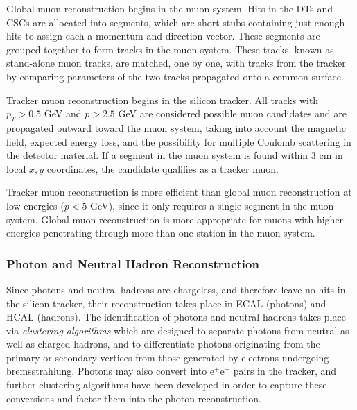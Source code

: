 Global muon reconstruction begins in the muon system. Hits in the DTs and CSCs are allocated into segments, which are short stubs containing just enough hits to assign each a momentum and direction vector. These segments are grouped together to form tracks in the muon system. These tracks, known as stand-alone muon tracks, are matched, one by one, with tracks from the tracker by comparing parameters of the two tracks propagated onto a common surface.

Tracker muon reconstruction begins in the silicon tracker. All tracks with $p_{T} > 0.5$ GeV and $p > 2.5$ GeV are considered possible muon candidates and are propagated outward toward the muon system, taking into account the magnetic field, expected energy loss, and the possibility for multiple Coulomb scattering in the detector material. If a segment in the muon system is found within 3 cm in local $x, y$ coordinates, the candidate qualifies as a tracker muon.

Tracker muon reconstruction is more efficient than global muon reconstruction at low energies ($p < 5$ GeV), since it only requires a single segment in the muon system. Global muon reconstruction is more appropriate for muons with higher energies penetrating through more than one station in the muon system.


\subsubsection{Photon and Neutral Hadron Reconstruction}

Since photons and neutral hadrons are chargeless, and therefore leave no hits in the silicon tracker, their reconstruction takes place in ECAL (photons) and HCAL (hadrons). The identification of photons and neutral hadrons takes place via \textit{clustering algorithms} which are designed to separate photons from neutral as well as charged hadrons, and to differentiate photons originating from the primary or secondary vertices from those generated by electrons undergoing bremsstrahlung. Photons may also convert into e$^+$e$^-$ pairs in the tracker, and further clustering algorithms have been developed in order to capture these conversions and factor them into the photon reconstruction.

